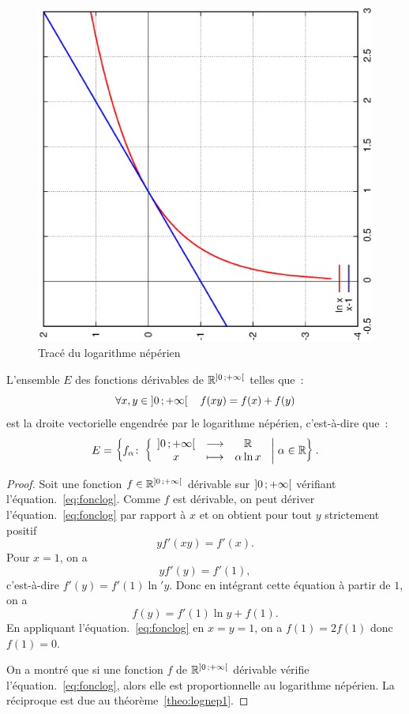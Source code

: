 %
\begin{figure}
  \centering
  \includegraphics[scale=0.4, angle=-90]{lognep.ps}
  \caption{Tracé du logarithme népérien}
  \label{fig:traceln}
\end{figure}
%
\begin{theo}
  L'ensemble $E$ des fonctions dérivables de $\mathbb{R}^{\left] 0 \, ;  +\infty \right[}$ telles que~:
  \begin{equation}
    \label{eq:fonclog}
    \forall x, y \in \left] 0 \, ;  +\infty \right[ \quad f(xy)=f(x)+f(y)
  \end{equation}
  est la droite vectorielle engendrée par le logarithme népérien, c'est-à-dire que~:
  \begin{equation}
    E=\left\{f_{\alpha}\colon \left\{\begin{array}{ccc} \left] 0 \, ;  +\infty \right[ & \longrightarrow &\mathbb{R}\\ x & \longmapsto & \alpha \ln x \end{array} \right.\mathrel{}\middle|\mathrel{}\alpha \in \mathbb{R}\right\}.
  \end{equation}
\end{theo}
\begin{proof}
  Soit une fonction $f \in \mathbb{R}^{\left] 0 \, ;  +\infty \right[}$ dérivable sur $\left] 0 \, ;  +\infty \right[$ vérifiant l'équation.~\eqref{eq:fonclog}. Comme $f$ est dérivable, on peut dériver l'équation.~\eqref{eq:fonclog} par rapport à $x$ et on obtient pour tout $y$ strictement positif
  \begin{equation}
    y f'(xy)=f'(x).
  \end{equation}
  Pour $x=1$, on a
  \begin{equation}
    y f'(y)=f'(1),
  \end{equation}
  c'est-à-dire $f'(y)=f'(1) \ln' y$. Donc en intégrant cette équation à partir de $1$, on a
  \begin{equation}
    f(y)=f'(1)\ln y + f(1).
  \end{equation}
  En appliquant l'équation.~\eqref{eq:fonclog} en $x=y=1$, on a $f(1)=2f(1)$ donc $f(1)=0$.

  On a montré que si une fonction $f$ de $\mathbb{R}^{\left] 0 \, ;  +\infty \right[}$ dérivable vérifie l'équation.~\eqref{eq:fonclog}, alors elle est proportionnelle au logarithme népérien. La réciproque est due au théorème~\ref{theo:lognep1}.
\end{proof}
%
